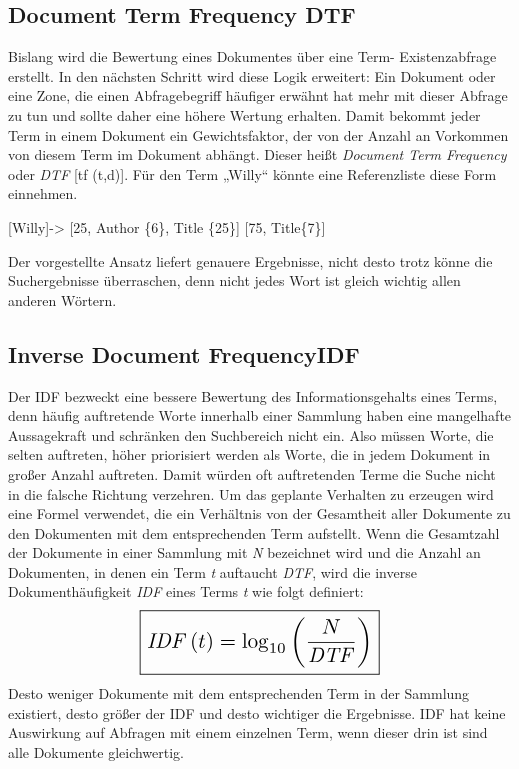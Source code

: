 \subsection[Document Term Frequency DTF]{Document Term Frequency DTF}
Bislang wird die Bewertung eines Dokumentes über eine Term-
Existenzabfrage erstellt. In den nächsten Schritt wird diese Logik
erweitert: Ein Dokument oder eine Zone, die einen Abfragebegriff
häufiger erwähnt hat mehr mit dieser Abfrage zu tun und sollte daher
eine höhere Wertung erhalten.
\newline
Damit bekommt jeder Term in einem Dokument ein Gewichtsfaktor, der von
der Anzahl an Vorkommen von diesem Term im Dokument abhängt. Dieser
heißt \textit{Document Term Frequency} oder \textit{DTF} [tf (t,d)]. 
\newline
Für den Term „Willy“ könnte eine Referenzliste diese Form einnehmen.
\begin{center}
 [Willy]-{\textgreater} [25, Author \{6\}, Title \{25\}] [75, Title\{7\}]
\end{center}
Der vorgestellte Ansatz liefert genauere Ergebnisse, nicht desto trotz
könne die Suchergebnisse überraschen, denn nicht jedes Wort ist gleich
wichtig allen anderen Wörtern. 

\subsection[Inverse Document Frequency IDF]{Inverse Document FrequencyIDF}
Der IDF bezweckt eine bessere Bewertung des Informationsgehalts eines
Terms, denn häufig auftretende Worte innerhalb einer Sammlung haben
eine mangelhafte Aussagekraft und schränken den Suchbereich nicht ein.
Also müssen Worte, die selten auftreten, höher priorisiert werden als
Worte, die in jedem Dokument in großer Anzahl auftreten. Damit würden
oft auftretenden Terme die Suche nicht in die falsche Richtung
verzehren. 
\bigbreak
Um das geplante Verhalten zu erzeugen wird eine Formel verwendet, die
ein Verhältnis von der Gesamtheit aller Dokumente zu den Dokumenten mit
dem entsprechenden Term aufstellt.
\newline
Wenn die Gesamtzahl der Dokumente in einer Sammlung mit \textit{N} bezeichnet
wird und die Anzahl an Dokumenten, in denen ein Term \textit{t} auftaucht
\textit{DTF}, wird die inverse Dokumenthäufigkeit \textit{IDF} eines Terms \textit{t} wie
folgt definiert: 
\newline
\begin{equation*}
\scalebox{1.5}{\boxed{\mathit{IDF}\left(t\right)={\log}_{10}\left(\frac{N}{\mathit{DTF}}\right)}}
\end{equation*}
\newline
Desto weniger Dokumente mit dem entsprechenden Term in der Sammlung
existiert, desto größer der IDF und desto wichtiger die Ergebnisse.
\newline
IDF hat keine Auswirkung auf Abfragen mit einem einzelnen Term, wenn
dieser drin ist sind alle Dokumente gleichwertig.



